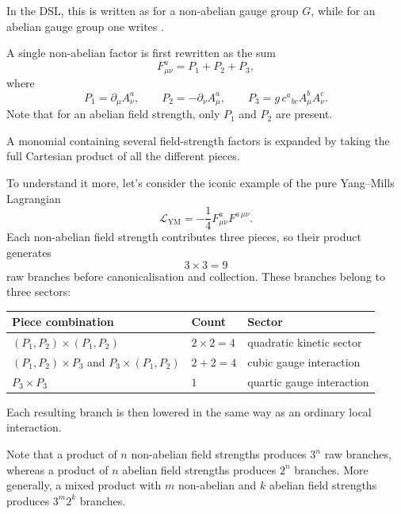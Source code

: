In the DSL, this is written as  for a non-abelian gauge group $G$, while for an abelian gauge group one writes .

A single non-abelian  factor is first rewritten as the sum
\begin{equation}
    F^a_{\mu\nu} = P_1 + P_2 + P_3,
\end{equation}
where
\begin{equation}
    P_1 = \partial_\mu A^a_\nu,
    \qquad
    P_2 = -\partial_\nu A^a_\mu,
    \qquad
    P_3 = g\,c^{a}{}_{bc}A^b_\mu A^c_\nu.
    \label{eq:fs-pieces}
\end{equation}
Note that for an abelian field strength, only $P_1$ and $P_2$ are present.

A monomial containing several field-strength factors is expanded by taking the full Cartesian product of all the different pieces.

To understand it more, let's consider the iconic example of the pure Yang--Mills Lagrangian
\begin{equation}
    \mathcal{L}_{\mathrm{YM}}
    =
    -\frac{1}{4}
    F^a_{\mu\nu}F^{a\,\mu\nu}.
\end{equation}
Each non-abelian field strength contributes three pieces, so their product generates
\begin{equation}
    3 \times 3 = 9
\end{equation}
raw branches before canonicalisation and collection. These branches belong to three sectors:
\begin{center}
\begin{tabular}{@{}lll@{}}
\toprule
\textbf{Piece combination} & \textbf{Count} & \textbf{Sector} \\
\midrule
$(P_1,P_2)\times(P_1,P_2)$
    & $2\times2=4$
    & quadratic kinetic sector \\
$(P_1,P_2)\times P_3$ and $P_3\times(P_1,P_2)$
    & $2+2=4$
    & cubic gauge interaction \\
$P_3\times P_3$
    & $1$
    & quartic gauge interaction \\
\bottomrule
\end{tabular}
\end{center}

Each resulting branch is then lowered in the same way as an ordinary local interaction.

Note that a product of $n$ non-abelian field strengths produces $3^n$ raw branches, whereas a product of $n$ abelian field strengths produces $2^n$ branches. More generally, a mixed product with $m$ non-abelian and $k$ abelian field strengths produces $3^m 2^k$ branches.



